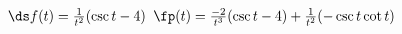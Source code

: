 {$\ds f(t) = \frac{1}{t^2}(\csc t-4)$
}
{$\fp(t) = \frac{-2}{t^3}(\csc t-4) + \frac{1}{t^2}(-\csc t\cot t)$
}
